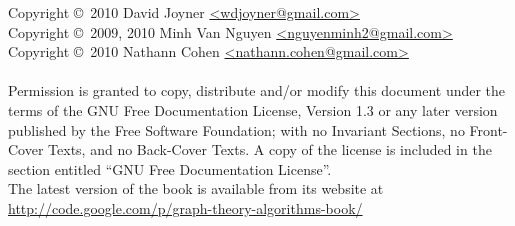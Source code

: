 \noindent Copyright \copyright\ 2010 David Joyner \url{<wdjoyner@gmail.com>} \\
Copyright \copyright\ 2009, 2010
Minh Van Nguyen \url{<nguyenminh2@gmail.com>} \\
Copyright \copyright\ 2010 Nathann Cohen \url{<nathann.cohen@gmail.com>} \\\\
Permission is granted to copy, distribute and/or modify this document
under the terms of the GNU Free Documentation License, Version 1.3
or any later version published by the Free Software Foundation;
with no Invariant Sections, no Front-Cover Texts, and no
Back-Cover Texts. A copy of the license is included in the section
entitled ``GNU Free Documentation License''. \\

\noindent
The latest version of the book is available from its website at \\

\url{http://code.google.com/p/graph-theory-algorithms-book/}
